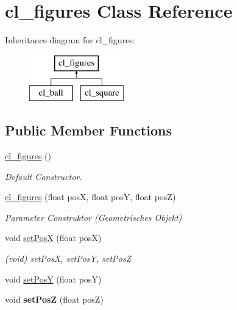 \hypertarget{classcl__figures}{}\section{cl\+\_\+figures Class Reference}
\label{classcl__figures}
Inheritance diagram for cl\+\_\+figures\+:\begin{figure}[H]
\begin{center}
\leavevmode
\includegraphics[height=2.000000cm]{classcl__figures}
\end{center}
\end{figure}
\subsection*{Public Member Functions}
{\bf }\par
\begin{DoxyCompactItemize}
\item 
\hyperlink{classcl__figures_ae32a5f74827021284748bb1f93ed88c0}{cl\+\_\+figures} ()
\begin{DoxyCompactList}\small\item\em Default Constructor. \end{DoxyCompactList}\item 
\hyperlink{classcl__figures_a7d40c61a6f518c59a7e4aebdbaac9ea2}{cl\+\_\+figures} (float pos\+X, float pos\+Y, float pos\+Z)
\begin{DoxyCompactList}\small\item\em Parameter Construktor (Geometrisches Objekt) \end{DoxyCompactList}\end{DoxyCompactItemize}

{\bf }\par
\begin{DoxyCompactItemize}
\item 
void \hyperlink{classcl__figures_af1c498c43e5f302f9701f99d4407e6f0}{set\+Pos\+X} (float pos\+X)
\begin{DoxyCompactList}\small\item\em (void) set\+Pos\+X, set\+Pos\+Y, set\+Pos\+Z \end{DoxyCompactList}\item 
void \hyperlink{classcl__figures_ae07156aefb81f1a9b460e743f8f8c410}{set\+Pos\+Y} (float pos\+Y)
\item 
\hypertarget{classcl__figures_aaf722642edb1bd71e56e5005ad509182}{}void {\bfseries set\+Pos\+Z} (float pos\+Z)\label{classcl__figures_aaf722642edb1bd71e56e5005ad509182}

\end{DoxyCompactItemize}

